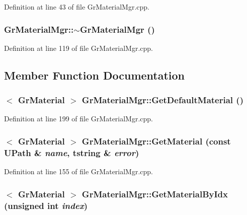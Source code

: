 Definition at line 43 of file GrMaterialMgr.cpp.\hypertarget{class_gr_material_mgr_6f3351d8076b7507fa619d690a5080bc}{
\subsubsection[{$\sim$GrMaterialMgr}]{\setlength{\rightskip}{0pt plus 5cm}GrMaterialMgr::$\sim$GrMaterialMgr ()}}
\label{class_gr_material_mgr_6f3351d8076b7507fa619d690a5080bc}




Definition at line 119 of file GrMaterialMgr.cpp.

\subsection{Member Function Documentation}
\hypertarget{class_gr_material_mgr_43336b522deb18479fb8a40756ef37f0}{
\subsubsection[{GetDefaultMaterial}]{$<$ {\bf GrMaterial} $>$ GrMaterialMgr::GetDefaultMaterial ()}}
\label{class_gr_material_mgr_43336b522deb18479fb8a40756ef37f0}




Definition at line 199 of file GrMaterialMgr.cpp.\hypertarget{class_gr_material_mgr_5cd1ffc48f5700668491231502af7be9}{
\subsubsection[{GetMaterial}]{$<$ {\bf GrMaterial} $>$ GrMaterialMgr::GetMaterial (const {\bf UPath} \& {\em name}, \/  {\bf tstring} \& {\em error})}}
\label{class_gr_material_mgr_5cd1ffc48f5700668491231502af7be9}




Definition at line 155 of file GrMaterialMgr.cpp.\hypertarget{class_gr_material_mgr_ce15b2856e2cbcb867f012daac7e8ed2}{
\subsubsection[{GetMaterialByIdx}]{$<$ {\bf GrMaterial} $>$ GrMaterialMgr::GetMaterialByIdx (unsigned int {\em index})}}
\label{class_gr_material_mgr_ce15b2856e2cbcb867f012daac7e8ed2}




